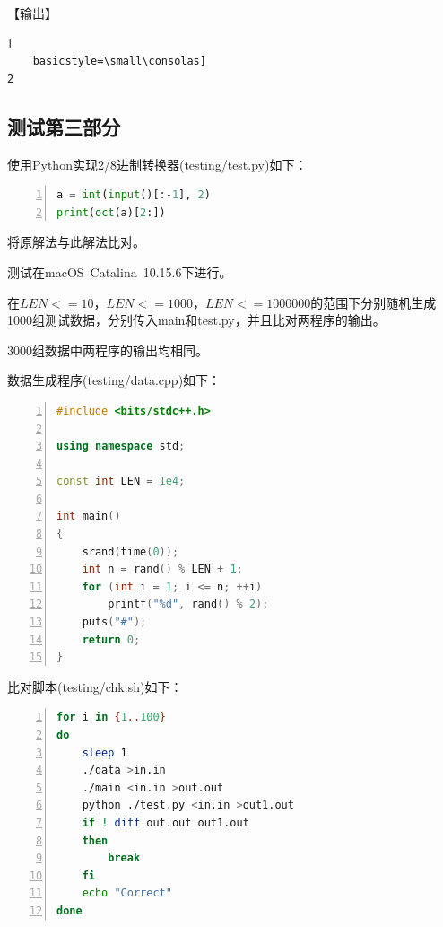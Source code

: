 \documentclass{article}
\begin{document}
【输出】

\begin{lstlisting}[
    basicstyle=\small\consolas]
2
\end{lstlisting}

\subsection{测试第三部分}

使用Python实现2/8进制转换器(testing/test.py)如下：

\begin{lstlisting}[language={Python},
    numbers=left,
    numberstyle=\tiny\consolas,
    basicstyle=\small\consolas]
a = int(input()[:-1], 2)
print(oct(a)[2:])
\end{lstlisting}

将原解法与此解法比对。

测试在macOS\ Catalina\ 10.15.6下进行。

在$LEN<=10$，$LEN<=1000$，$LEN<=1000000$的范围下分别随机生成1000组测试数据，分别传入main和test.py，并且比对两程序的输出。

3000组数据中两程序的输出均相同。

数据生成程序(testing/data.cpp)如下：

\begin{lstlisting}[language={C++},
    numbers=left,
    numberstyle=\tiny\consolas,
    basicstyle=\small\consolas]
#include <bits/stdc++.h>

using namespace std;

const int LEN = 1e4;

int main()
{
    srand(time(0));
    int n = rand() % LEN + 1;
    for (int i = 1; i <= n; ++i)
        printf("%d", rand() % 2);
    puts("#");
    return 0;
}
\end{lstlisting}

比对脚本(testing/chk.sh)如下：

\begin{lstlisting}[language={bash},
    numbers=left,
    numberstyle=\tiny\consolas,
    basicstyle=\small\consolas]
for i in {1..100}
do
    sleep 1
    ./data >in.in
    ./main <in.in >out.out
    python ./test.py <in.in >out1.out
    if ! diff out.out out1.out
    then
        break
    fi
    echo "Correct"
done
\end{lstlisting}
\end{document}
